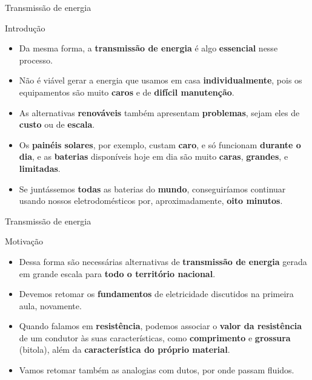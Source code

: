 \begin{frame}{Transmissão de energia}
	\begin{block}{Introdução}
		\begin{itemize}
			\item Da mesma forma, a \textbf{transmissão de energia} é algo \textbf{essencial} nesse processo.
			\item Não é viável gerar a energia que usamos em casa \textbf{individualmente}, pois os equipamentos são muito \textbf{caros} e de \textbf{difícil manutenção}.
			\item As alternativas \textbf{renováveis} também apresentam \textbf{problemas}, sejam eles de \textbf{custo} ou de \textbf{escala}.
			\item Os \textbf{painéis solares}, por exemplo, custam \textbf{caro}, e só funcionam \textbf{durante o dia}, e as \textbf{baterias} disponíveis hoje em dia são muito \textbf{caras}, \textbf{grandes}, e \textbf{limitadas}.
			\item Se juntássemos \textbf{todas} as baterias do \textbf{mundo}, conseguiríamos continuar usando nossos eletrodomésticos por, aproximadamente, \textbf{oito minutos}.
		\end{itemize}
	\end{block}
\end{frame}


\begin{frame}{Transmissão de energia}
	\begin{block}{Motivação}
		\begin{itemize}
			\item Dessa forma são necessárias alternativas de \textbf{transmissão de energia} gerada em grande escala para \textbf{todo o território nacional}.
			\item Devemos retomar os \textbf{fundamentos} de eletricidade discutidos na primeira aula, novamente.
			\item Quando falamos em \textbf{resistência}, podemos associar o \textbf{valor da resistência} de um condutor às suas características, como \textbf{comprimento} e \textbf{grossura} (bitola), além da \textbf{característica do próprio material}.
			\item Vamos retomar também as analogias com dutos, por onde passam fluidos.
		\end{itemize}
	\end{block}
\end{frame}


